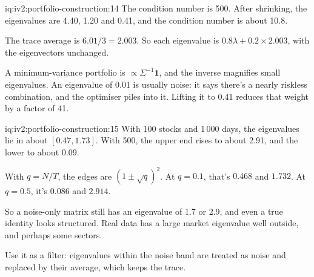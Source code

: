 \begin{solution}{iq:iv2:portfolio-construction:14}
The condition number is 500. After shrinking, the eigenvalues are 4.40, 1.20 and 0.41, and the condition number is about 10.8.

The trace average is $6.01/3 = 2.003$. So each eigenvalue is $0.8\lambda + 0.2 \times 2.003$, with the eigenvectors unchanged.

A minimum-variance portfolio is $\propto \Sigma^{-1}\mathbf{1}$, and the inverse magnifies small eigenvalues. An eigenvalue of 0.01 is usually noise: it says there's a nearly riskless combination, and the optimiser piles into it. Lifting it to 0.41 reduces that weight by a factor of 41.

\end{solution}

\begin{solution}{iq:iv2:portfolio-construction:15}
With 100 stocks and 1\,000 days, the eigenvalues lie in about $[0.47, 1.73]$. With 500, the upper end rises to about 2.91, and the lower to about 0.09.

With $q = N/T$, the edges are $(1 \pm \sqrt{q})^2$. At $q = 0.1$, that's $0.468$ and $1.732$. At $q = 0.5$, it's $0.086$ and $2.914$.

So a noise-only matrix still has an eigenvalue of 1.7 or 2.9, and even a true identity looks structured. Real data has a large market eigenvalue well outside, and perhaps some sectors.

Use it as a filter: eigenvalues within the noise band are treated as noise and replaced by their average, which keeps the trace.

\end{solution}


